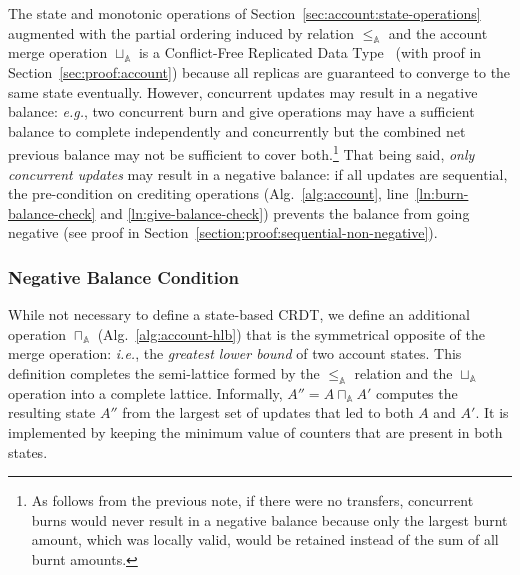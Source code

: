 \documentclass[9pt]{article}   	%
\begin{document}
The state and monotonic operations  of Section~\ref{sec:account:state-operations} augmented with the partial ordering induced by relation $\leq_\mathds{A}$ and the account merge operation $\sqcup_\mathds{A}$ is a Conflict-Free Replicated Data Type~\cite{shapiro:hal-00932836} (with proof in Section~\ref{sec:proof:account}) because all replicas are guaranteed to converge to the same state eventually. However, concurrent updates may result in a negative balance: \textit{e.g.}, two concurrent burn and give operations may have a sufficient balance to complete independently and concurrently but the combined net previous balance may not be sufficient to cover both.\footnote{As follows from the previous note, if there were no transfers, concurrent burns would never result in a negative balance because only the largest burnt amount, which was locally valid, would be retained instead of the sum of all burnt amounts.} That being said, \textit{only concurrent updates} may result in a negative balance: if all updates are sequential, the pre-condition on crediting operations (Alg.~\ref{alg:account}, line~\ref{ln:burn-balance-check} and \ref{ln:give-balance-check}) prevents the balance from going negative (see proof in Section~\ref{section:proof:sequential-non-negative}).

\subsubsection{Negative Balance Condition}

While not necessary to define a state-based CRDT, we define an additional operation $\sqcap_\mathds{A}$ (Alg.~\ref{alg:account-hlb}) that is the symmetrical opposite of the merge operation: \textit{i.e.}, the \textit{greatest lower bound} of two account states. This definition completes the semi-lattice formed by the $\leq_\mathds{A}$ relation and the $\sqcup_\mathds{A}$ operation into a complete lattice. Informally, $A'' = A \sqcap_\mathds{A} A'$ computes the resulting state $A''$ from the largest set of updates that led to both $A$ and $A'$. It is implemented by keeping the minimum value of counters that are present in both states.
\end{document}

